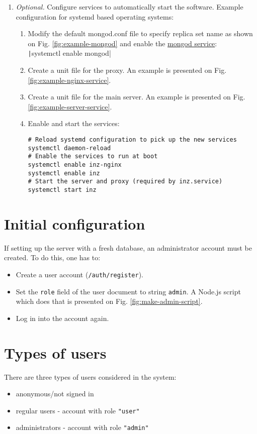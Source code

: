 \begin{enumerate}
    \item \textit{Optional.} Configure services to automatically start the software. Example configuration for systemd based operating systems:
    \begin{enumerate}
        \item Modify the default mongod.conf file to specify replica set name as shown on Fig. \ref{fig:example-mongod} and enable the \href{https://github.com/mongodb/mongo/blob/e4fff3e1fe7b31b25cedde7b05205325b47b4a7d/debian/mongod.service}{mongod service}:\\
        \texttt|systemctl enable mongod|
        \item Create a unit file for the proxy. An example is presented on Fig. \ref{fig:example-nginx-service}.
        \item Create a unit file for the main server. An example is presented on Fig. \ref{fig:example-server-service}.
        \item Enable and start the services:
        \begin{verbatim}
# Reload systemd configuration to pick up the new services
systemctl daemon-reload
# Enable the services to run at boot
systemctl enable inz-nginx
systemctl enable inz
# Start the server and proxy (required by inz.service)
systemctl start inz
        \end{verbatim}
    \end{enumerate}
\end{enumerate}

\section{Initial configuration}

If setting up the server with a fresh database, an administrator account must be created. To do this, one has to:

\begin{itemize}
    \item Create a user account (\texttt{/auth/register}).
    \item Set the \texttt{role} field of the user document to string \texttt{admin}. A Node.js script which does that is presented on Fig. \ref{fig:make-admin-script}.
    \item Log in into the account again.
\end{itemize}

\section{Types of users}

There are three types of users considered in the system:

\begin{itemize}
    \item anonymous/not signed in
    \item regular users - account with role \texttt{"user"}
    \item administrators - account with role \texttt{"admin"}
\end{itemize}

